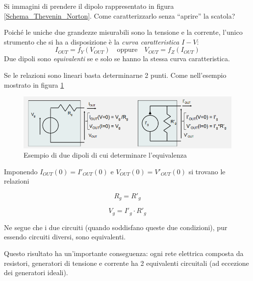 \documentclass{article}
\begin{document}
Si immagini di prendere il dipolo rappresentato in figura \ref{Schema_Thevenin_Norton}. Come caratterizzarlo senza ``aprire'' la scatola?

\vspace{1mm}

Poiché le uniche due grandezze misurabili sono la tensione e la corrente, l'unico strumento che si ha a disposizione è la \textit{curva caratteristica} $I-V$:
\[I_{OUT} = f_Y(V_{OUT}) \quad \textrm{oppure} \quad V_{OUT} = f_Z(I_{OUT})\]
Due dipoli sono \textit{equivalenti} se e solo se hanno la stessa curva caratteristica.

\vspace{1mm}

Se le relazioni sono lineari basta determinarne 2 punti. Come nell'esempio mostrato in figura \ref{Schema_Thevenin_Norton_bis}

\begin{figure}[h]
  \centering
  \includegraphics[scale=0.7]{IM_Thevenin_Norton_bis}
  \caption{Esempio di due dipoli di cui determinare l'equivalenza}
  \label{Schema_Thevenin_Norton_bis}
\end{figure}

Imponendo $I_{OUT} (0) = I'_{OUT} (0)$ e $V_{OUT} (0) = V'_{OUT} (0)$ si trovano le relazioni

\[R_g = R'_g\]

\[V_g = I'_g \cdot R'_g\]

Ne segue che i due circuiti (quando soddisfano queste due condizioni), pur essendo circuiti diversi, sono equivalenti.

\vspace{1mm}

Questo risultato ha un'importante conseguenza: ogni rete elettrica composta da resistori, generatori di tensione e corrente ha 2 equivalenti circuitali (ad eccezione dei generatori ideali).

\clearpage
\end{document}
